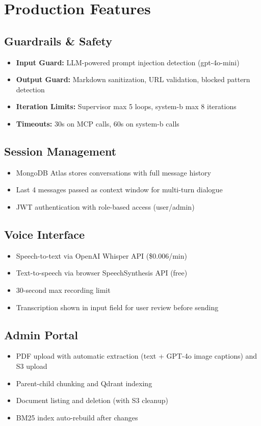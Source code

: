 \documentclass[12pt,a4paper]{article}
\begin{document}
\section{Production Features}

\subsection{Guardrails \& Safety}
\begin{itemize}
  \item \textbf{Input Guard:} LLM-powered prompt injection detection (gpt-4o-mini)
  \item \textbf{Output Guard:} Markdown sanitization, URL validation, blocked pattern detection
  \item \textbf{Iteration Limits:} Supervisor max 5 loops, system-b max 8 iterations
  \item \textbf{Timeouts:} 30s on MCP calls, 60s on system-b calls
\end{itemize}

\subsection{Session Management}
\begin{itemize}
  \item MongoDB Atlas stores conversations with full message history
  \item Last 4 messages passed as context window for multi-turn dialogue
  \item JWT authentication with role-based access (user/admin)
\end{itemize}

\subsection{Voice Interface}
\begin{itemize}
  \item Speech-to-text via OpenAI Whisper API (\$0.006/min)
  \item Text-to-speech via browser SpeechSynthesis API (free)
  \item 30-second max recording limit
  \item Transcription shown in input field for user review before sending
\end{itemize}

\subsection{Admin Portal}
\begin{itemize}
  \item PDF upload with automatic extraction (text + GPT-4o image captions) and S3 upload
  \item Parent-child chunking and Qdrant indexing
  \item Document listing and deletion (with S3 cleanup)
  \item BM25 index auto-rebuild after changes
\end{itemize}
\end{document}
